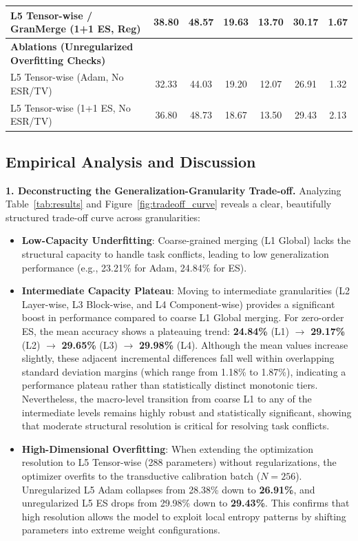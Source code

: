 \begin{table}[t]
\begin{center}
\begin{small}
\begin{sc}
{\begin{tabular}{lcccccc}
L5 Tensor-wise / GranMerge (1+1 ES, Reg) & 38.80 & 48.57 & 19.63 & 13.70 & 30.17 & 1.67 \\
\midrule
\textbf{Ablations (Unregularized Overfitting Checks)} \\
L5 Tensor-wise (Adam, No ESR/TV) & 32.33 & 44.03 & 19.20 & 12.07 & 26.91 & 1.32 \\
L5 Tensor-wise (1+1 ES, No ESR/TV) & 36.80 & 48.73 & 18.67 & 13.50 & 29.43 & 2.13 \\
\bottomrule
\end{tabular}%
}
\end{sc}
\end{small}
\end{center}
\vskip -0.1in
\end{table}

\subsection{Empirical Analysis and Discussion}

\textbf{1. Deconstructing the Generalization-Granularity Trade-off.} 
Analyzing Table~\ref{tab:results} and Figure~\ref{fig:tradeoff_curve} reveals a clear, beautifully structured trade-off curve across granularities:
\begin{itemize}
    \item \textbf{Low-Capacity Underfitting}: Coarse-grained merging (L1 Global) lacks the structural capacity to handle task conflicts, leading to low generalization performance (e.g., 23.21\% for Adam, 24.84\% for ES).
    \item \textbf{Intermediate Capacity Plateau}: Moving to intermediate granularities (L2 Layer-wise, L3 Block-wise, and L4 Component-wise) provides a significant boost in performance compared to coarse L1 Global merging. For zero-order ES, the mean accuracy shows a plateauing trend: \textbf{24.84\%} (L1) $\rightarrow$ \textbf{29.17\%} (L2) $\rightarrow$ \textbf{29.65\%} (L3) $\rightarrow$ \textbf{29.98\%} (L4). Although the mean values increase slightly, these adjacent incremental differences fall well within overlapping standard deviation margins (which range from 1.18\% to 1.87\%), indicating a performance plateau rather than statistically distinct monotonic tiers. Nevertheless, the macro-level transition from coarse L1 to any of the intermediate levels remains highly robust and statistically significant, showing that moderate structural resolution is critical for resolving task conflicts.
    \item \textbf{High-Dimensional Overfitting}: When extending the optimization resolution to L5 Tensor-wise (288 parameters) without regularizations, the optimizer overfits to the transductive calibration batch ($N=256$). Unregularized L5 Adam collapses from 28.38\% down to \textbf{26.91\%}, and unregularized L5 ES drops from 29.98\% down to \textbf{29.43\%}. This confirms that high resolution allows the model to exploit local entropy patterns by shifting parameters into extreme weight configurations.
\end{itemize}

